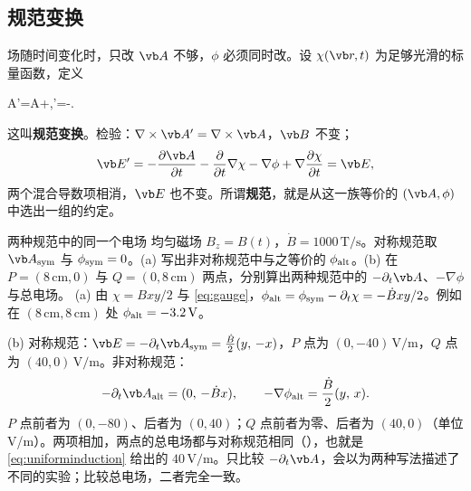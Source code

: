 \subsection{规范变换}
场随时间变化时，只改 $\vb A$ 不够，$\phi$ 必须同时改。设 $\chi(\vb r,t)$ 为足够光滑的标量函数，定义
\begin{keyeq}
\vb A'=\vb A+\nabla\chi,\qquad \phi'=\phi-.
\label{eq:gauge}
\end{keyeq}
这叫\textbf{规范变换}。检验：$\nabla\times\vb A'=\nabla\times\vb A$，$\vb B$ 不变；
\begin{equation}
\vb E'=-\frac{\partial\vb A}{\partial t}-\frac{\partial}{\partial t}\nabla\chi-\nabla\phi+\nabla\frac{\partial\chi}{\partial t}=\vb E ,
\end{equation}
两个混合导数项相消，$\vb E$ 也不变。所谓\textbf{规范}，就是从这一族等价的 $(\vb A,\phi)$ 中选出一组的约定。

\begin{example}{两种规范中的同一个电场}\label{ex:potentials-gauge}
均匀磁场 $B_z=B(t)$，$\dot B=1000\,\mathrm{T/s}$。对称规范取 $\vb A_{\rm sym}$ 与 $\phi_{\rm sym}=0$。(a) 写出非对称规范中与之等价的 $\phi_{\rm alt}$。(b) 在 $P=(8\,\mathrm{cm},0)$ 与 $Q=(0,8\,\mathrm{cm})$ 两点，分别算出两种规范中的 $-\partial_t\vb A$、$-\nabla\phi$ 与总电场。
\solution
(a) 由 $\chi=Bxy/2$ 与 \eqref{eq:gauge}，$\phi_{\rm alt}=\phi_{\rm sym}-\partial_t\chi=-\dot Bxy/2$。例如在 $(8\,\mathrm{cm},8\,\mathrm{cm})$ 处 $\phi_{\rm alt}=-3.2\,\mathrm V$。

(b) 对称规范：$\vb E=-\partial_t\vb A_{\rm sym}=\tfrac{\dot B}{2}(y,\,-x)$，$P$ 点为 $(0,-40)\,\mathrm{V/m}$，$Q$ 点为 $(40,0)\,\mathrm{V/m}$。非对称规范：
\begin{equation*}
-\partial_t\vb A_{\rm alt}=(0,\,-\dot Bx),\qquad -\nabla\phi_{\rm alt}=\frac{\dot B}{2}(y,\,x).
\end{equation*}
$P$ 点前者为 $(0,-80)$、后者为 $(0,40)$；$Q$ 点前者为零、后者为 $(40,0)$（单位 V/m）。两项相加，两点的总电场都与对称规范相同（），也就是 \eqref{eq:uniforminduction} 给出的 $40\,\mathrm{V/m}$。只比较 $-\partial_t\vb A$，会以为两种写法描述了不同的实验；比较总电场，二者完全一致。
\end{example}


